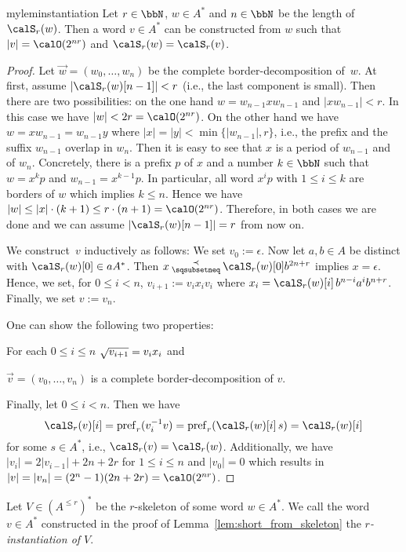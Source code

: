 \begin{restatable}{mylem}{instantiation}\label{lem:short_from_skeleton}
	Let $r\in\bbN$, $w\in A^*$ and $n\in\bbN$ be the length of $\calS_r(w)$. Then a word $v\in A^*$ can be constructed from $w$ such that $|v|=\calO(2^{nr})$ and $\calS_r(w)=\calS_r(v)$.
\end{restatable}
\begin{proof}
	Let $\vec{w}=(w_0,\dots,w_n)$ be the complete border-decomposition of~$w$. At first, assume $|\calS_r(w)[n-1]|<r$ (i.e., the last component is small). Then there are two possibilities: on the one hand $w=w_{n-1}xw_{n-1}$ and $|xw_{n-1}|<r$. In this case we have $|w|<2r=\calO(2^{nr})$. On the other hand we have $w=xw_{n-1}=w_{n-1}y$ where $|x|=|y|<\min\{|w_{n-1}|,r\}$, i.e., the prefix and the suffix $w_{n-1}$ overlap in $w_n$. Then it is easy to see that $x$ is a period of $w_{n-1}$ and of $w_n$. Concretely, there is a prefix $p$ of $x$ and a number $k\in\bbN$ such that $w=x^kp$ and $w_{n-1}=x^{k-1}p$. In particular, all word $x^ip$ with $1\leq i\leq k$ are borders of $w$ which implies $k\leq n$. Hence we have $|w|\leq|x|\cdot(k+1)\leq r\cdot(n+1)=\calO(2^{nr})$. Therefore, in both cases we are done and we can assume $|\calS_r(w)[n-1]|=r$ from now on.
	
	We construct~$v$ inductively as follows: We set $v_0:=\epsilon$. Now let $a,b\in A$ be distinct with $\calS_r(w)[0]\in aA^*$. Then $x\presuf\calS_r(w)[0]b^{2n+r}$ implies $x=\epsilon$. Hence, we set, for $0\leq i<n$, $v_{i+1}:=v_ix_iv_i$ where $x_i=\calS_r(w)[i]\,b^{n-i}a^ib^{n+r}$. Finally, we set $v:=v_{n}$.
	
	One can show the following two properties:
	\begin{alphaenumerate}
		\item For each $0\leq i\leq n$ $\sqrt{v_{i+1}}=v_ix_i$ and
		\item $\vec{v}=(v_0,\dots,v_{n})$ is a complete border-decomposition of $v$.
	\end{alphaenumerate}
	Finally, let $0\leq i<n$. Then we have
	\[\calS_r(v)[i]=\pref_r(\inv{v_i}v)=\pref_r(\calS_r(w)[i]\,s)=\calS_r(w)[i]\]
	for some $s\in A^*$, i.e., $\calS_r(v)=\calS_r(w)$. Additionally, we have $|v_i|=2|v_{i-1}|+2n+2r$ for $1\leq i\leq n$ and $|v_0|=0$ which results in $|v|=|v_n|=(2^n-1)(2n+2r)=\calO(2^{nr})$.
\end{proof}

Let $V\in (A^{\leq r})^*$ be the $r$-skeleton of some word $w\in A^*$. We call the word $v\in A^*$ constructed in the proof of Lemma~\ref{lem:short_from_skeleton} the \emph{$r$-instantiation of $V$}.